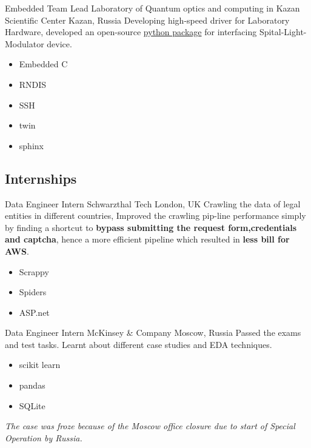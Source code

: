         {}
        {Embedded Team Lead}
        {Laboratory of Quantum optics and  computing  in  Kazan Scientific Center}
        {Kazan, Russia}
        {
        \newline
        Developing high-speed driver for Laboratory Hardware, developed an open-source \href{https://pypi.org/project/holoeye-embedded/}{\color{blue}python package} for interfacing Spital-Light-Modulator device.    
        } 
        {
        \begin{itemize}
            \item Embedded C
            \item RNDIS
            \item SSH
            \item twin
            \item sphinx
        \end{itemize}
        }



\vspace{2mm}
\subsection{\Large{Internships}}


                {Data Engineer Intern}
                {Schwarzthal Tech}
                {London, UK}
                {
                \newline
                Crawling the data of legal entities in different countries, Improved the crawling pip-line performance simply by finding a shortcut to \textbf{bypass submitting the request form,credentials and captcha}, hence a more efficient pipeline which resulted in \textbf{less bill for AWS}.  } 
                {
                \begin{itemize}
                    \item Scrappy
                    \item Spiders
                    \item ASP.net 
                \end{itemize}
                }
        
        {Data Engineer Intern}
        {McKinsey \& Company}
        {Moscow, Russia}
        {
        \newline
        Passed the exams and test tasks.
        Learnt about different case studies and EDA techniques.
        } 
        {
        \begin{itemize}
            \item scikit learn
            \item pandas
            \item SQLite
        \end{itemize}
        \textit{The case was froze because of the Moscow office closure due to start of Special Operation by Russia.}
        }
        

